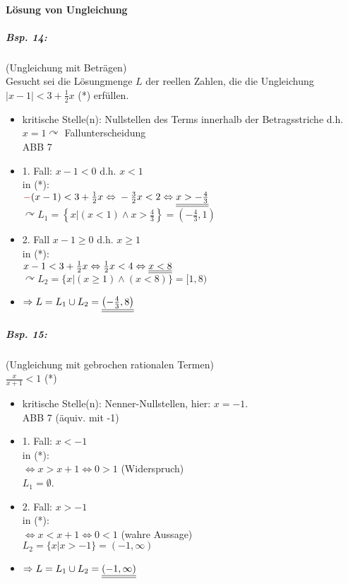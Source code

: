\paragraph{Lösung von Ungleichung}
\subparagraph{Bsp. 14:} (Ungleichung mit Beträgen)\\
Gesucht sei die Lösungmenge $L$ der reellen Zahlen, die die Ungleichung $|x-1|<3+\frac{1}{2}x$ (*) erfüllen.
\begin{itemize}
\item kritische Stelle(n): Nullstellen des Terms innerhalb der Betragsstriche d.h. $x=1 \curvearrowright$ Fallunterscheidung\\
ABB 7
\item 1. Fall: $x-1<0$ d.h. $x<1$\\
in (*): \\
$\tred{-}(x-1)<3+\frac{1}{2}x \Leftrightarrow \\
-\frac{3}{2}x<2 \Leftrightarrow \\
\resultul{x>-\frac{4}{3}}$\\
$\curvearrowright L_1=\left\lbrace x|(x<1) \wedge x>\frac{4}{3}\right\rbrace = \left(-\frac{4}{3},1\right)$
\item 2. Fall $x-1 \geq 0$ d.h. $x\geq 1$\\
in (*):\\
$x-1< 3+ \frac{1}{2}x \Leftrightarrow\\
\frac{1}{2}x<4 \Leftrightarrow\\
\underline{\underline{x<8}}$\\
$\curvearrowright L_2 = \{ x| (x\geq 1) \wedge (x <8)\}=[1,8)$
\item $\Rightarrow L = L_1 \cup L_2 = \underline{\underline{\left(-\frac{4}{3},8\right)}}$
\end{itemize}
\subparagraph{Bsp. 15:} (Ungleichung mit gebrochen rationalen Termen)\\
$\frac{x}{x+1}<1$ (*)
\begin{itemize}
\item kritische Stelle(n): Nenner-Nullstellen, hier: $x=-1$.\\
ABB 7 (äquiv. mit -1)
\item 1. Fall: $x<-1$\\
in (*):\\
$\Leftrightarrow x>x+1 \Leftrightarrow 0>1$ (Widerspruch)\\
$L_1=\emptyset$.
\item 2. Fall: $x > -1$\\
in (*):\\
$\Leftrightarrow x < x+1 \Leftrightarrow 0<1$ (wahre Aussage)\\
$L_2=\{x|x>-1\}=(-1,\infty)$
\item $\Rightarrow L = L_1 \cup L_2 = \underline{\underline{(-1,\infty)}}$
\end{itemize}
